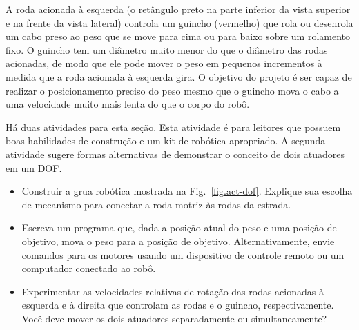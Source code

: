 A roda acionada à esquerda (o retângulo preto na parte inferior da vista superior e na frente da vista lateral) controla um guincho (vermelho) que rola ou desenrola um cabo preso ao peso que se move para cima ou para baixo sobre um rolamento fixo. O guincho tem um diâmetro muito menor do que o diâmetro das rodas acionadas, de modo que ele pode mover o peso em pequenos incrementos à medida que a roda acionada à esquerda gira. O objetivo do projeto é ser capaz de realizar o posicionamento preciso do peso mesmo que o guincho mova o cabo a uma velocidade muito mais lenta do que o corpo do robô.

Há duas atividades para esta seção. Esta atividade é para leitores que possuem boas habilidades de construção e um kit de robótica apropriado. A segunda atividade sugere formas alternativas de demonstrar o conceito de dois atuadores em um DOF.

\begin{framed}
\begin{itemize}
\item Construir a grua robótica mostrada na Fig.~\ref{fig.act-dof}. Explique sua escolha de mecanismo para conectar a roda motriz às rodas da estrada.
\item Escreva um programa que, dada a posição atual do peso e uma posição de objetivo, mova o peso para a posição de objetivo. Alternativamente, envie comandos para os motores usando um dispositivo de controle remoto ou um computador conectado ao robô.
\item Experimentar as velocidades relativas de rotação das rodas acionadas à esquerda e à direita que controlam as rodas e o guincho, respectivamente. Você deve mover os dois atuadores separadamente ou simultaneamente?
\end{itemize}
\end{framed}

